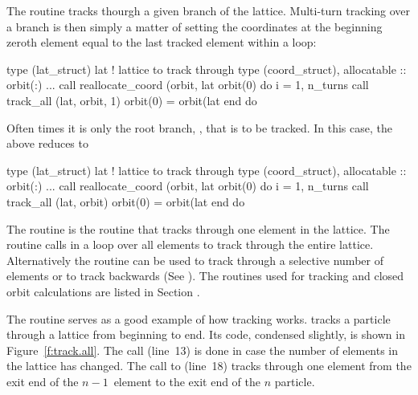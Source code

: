 {{{{{{The routine  tracks thourgh a given branch of the
lattice.  Multi-turn tracking over a branch is then simply a matter of
setting the coordinates at the beginning zeroth element equal to the
last tracked element within a loop:
\begin{example}
  type (lat_struct) lat             ! lattice to track through
  type (coord_struct), allocatable :: orbit(:)
  ...
  call reallocate_coord (orbit, lat%
  orbit(0)%
  do i = 1, n_turns
    call track_all (lat, orbit, 1)
    orbit(0) = orbit(lat%
  end do
\end{example}
Often times it is only the root branch, , that is to be tracked.
In this case, the above reduces to
\begin{example}
  type (lat_struct) lat             ! lattice to track through
  type (coord_struct), allocatable :: orbit(:)
  ...
  call reallocate_coord (orbit, lat%
  orbit(0)%
  do i = 1, n_turns
    call track_all (lat, orbit)
    orbit(0) = orbit(lat%
  end do
\end{example}

The routine  is the routine that tracks through one
element in the lattice. The routine  calls 
in a loop over all elements to track through the entire
lattice. Alternatively the routine  can be used to
track through a selective number of elements or to track backwards
(See ). The routines used for tracking
and closed orbit calculations are listed in Section .

The  routine serves as a good example of how tracking
works.  tracks a particle through a lattice from
beginning to end. Its code, condensed slightly, is shown in
Figure~\ref{f:track.all}.  The  call (line~13) is
done in case the number of elements in the lattice has changed. The
call to  (line~18) tracks through one element from the exit
end of the $n-1$\St\ element to the exit end of the $n$\Th
particle. \vn{lat%
calling routine whether a particle has been lost.  This generally
happens when the particle's position is larger then the aperture. When
a particle is lost \vn{lat%
what element the loss occurred.

}}}}}}}}
